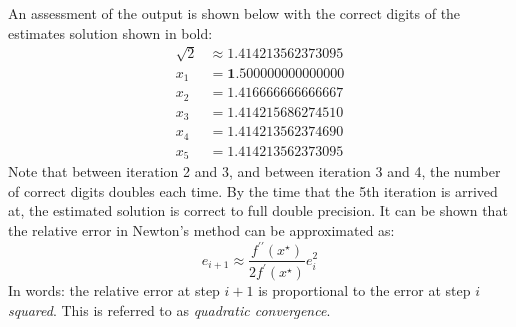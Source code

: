 An assessment of the output is shown below with the correct digits of the estimates solution shown in bold:
\begin{align*}
\sqrt{2} &\approx 1.414213562373095 \\
x_1 &= \mathbf{1.}500000000000000 \\
x_2 &= \mathbf{1.41}6666666666667 \\
x_3 &= \mathbf{1.41421}5686274510 \\
x_4 &= \mathbf{1.41421356237}4690 \\
x_5 &= \mathbf{1.414213562373095} 
\end{align*}
Note that between iteration 2 and 3, and between iteration 3 and 4, the number of correct digits doubles each time.  By the time that the 5th iteration is arrived at, the estimated solution is correct to full double precision.  It can be shown that the relative error in Newton's method can be approximated as:
\begin{equation*}
e_{i+1} \approx \frac{f^{\prime \prime}(x^{\star})}{2 f^{\prime}(x^{\star})}e_{i}^2
\end{equation*}
In words: the relative error at step $i+1$ is proportional to the error at step $i$ \emph{squared}.  This is referred to as \emph{quadratic convergence}.

